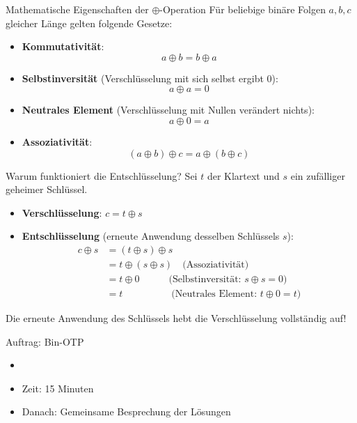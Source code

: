 \begin{frame}{Mathematische Eigenschaften der $\oplus$-Operation}
	Für beliebige binäre Folgen $a, b, c$ gleicher Länge gelten folgende Gesetze:
	
	\begin{itemize}[<+->]
		\item \textbf{Kommutativität}: 
		      \[ a \oplus b = b \oplus a \]
		\item \textbf{Selbstinversität} (Verschlüsselung mit sich selbst ergibt $0$): 
		      \[ a \oplus a = 0 \]
		\item \textbf{Neutrales Element} (Verschlüsselung mit Nullen verändert nichts): 
		      \[ a \oplus 0 = a \]
		\item \textbf{Assoziativität}: 
		      \[ (a \oplus b) \oplus c = a \oplus (b \oplus c) \]
	\end{itemize}
\end{frame}

\begin{frame}{Warum funktioniert die Entschlüsselung?}
	Sei $t$ der Klartext und $s$ ein zufälliger geheimer Schlüssel.
	
	\begin{itemize}[<+->]
		\item \textbf{Verschlüsselung}: $c = t \oplus s$
		\item \textbf{Entschlüsselung} (erneute Anwendung desselben Schlüssels $s$):
		      \begin{align*}
			      c \oplus s & = (t \oplus s) \oplus s \\
			                 & = t \oplus (s \oplus s) \quad \text{(Assoziativität)} \\
			                 & = t \oplus 0 \qquad\quad \text{(Selbstinversität: } s \oplus s = 0\text{)} \\
			                 & = t \qquad\qquad\quad \text{(Neutrales Element: } t \oplus 0 = t\text{)}
		      \end{align*}
	\end{itemize}
	\pause
	Die erneute Anwendung des Schlüssels hebt die Verschlüsselung vollständig auf!
\end{frame}

\begin{frame}{Auftrag: Bin-OTP}
	\begin{itemize}
		\item {}
		\item Zeit: 15 Minuten
		\item Danach: Gemeinsame Besprechung der Lösungen
	\end{itemize}
\end{frame}
